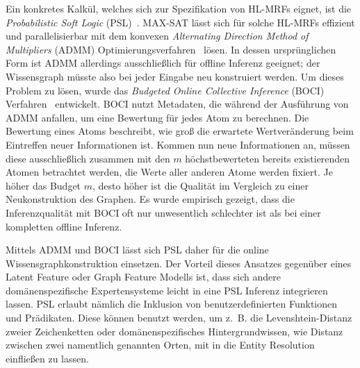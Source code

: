 Ein konkretes Kalkül, welches sich zur Spezifikation von HL-MRFs eignet, ist die \textit{Probabilistic Soft Logic} (PSL)~\cite{Broecheler2010}\cite{Bach2015}.
MAX-SAT lässt sich für solche HL-MRFs effizient und parallelisierbar mit dem konvexen \textit{Alternating Direction Method of Multipliers} (ADMM) Optimierungsverfahren~\cite{Boyd2011} lösen.
In dessen ursprünglichen Form ist ADMM allerdings ausschließlich für offline Inferenz geeignet;
der Wissensgraph müsste also bei jeder Eingabe neu konstruiert werden.
Um dieses Problem zu lösen, wurde das \textit{Budgeted Online Collective Inference} (BOCI) Verfahren~\cite{Pujara2015} entwickelt.
BOCI nutzt Metadaten, die während der Ausführung von ADMM anfallen, um eine Bewertung für jedes Atom zu berechnen.
Die Bewertung eines Atoms beschreibt, wie groß die erwartete Wertveränderung beim Eintreffen neuer Informationen ist.
Kommen nun neue Informationen an, müssen diese ausschließlich zusammen mit den $m$ höchstbewerteten bereits existierenden Atomen betrachtet werden, die Werte aller anderen Atome werden fixiert.
Je höher das Budget $m$, desto höher ist die Qualität im Vergleich zu einer Neukonstruktion des Graphen.
Es wurde empirisch gezeigt, dass die Inferenzqualität mit BOCI oft nur unwesentlich schlechter ist als bei einer kompletten offline Inferenz.

Mittels ADMM und BOCI lässt sich PSL daher für die online Wissensgraphkonstruktion einsetzen.
Der Vorteil dieses Ansatzes gegenüber eines Latent Feature oder Graph Feature Modells ist, dass sich andere domänenspezifische Expertensysteme leicht in eine PSL Inferenz integrieren lassen.
PSL erlaubt nämlich die Inklusion von benutzerdefinierten Funktionen und Prädikaten.
Diese können benutzt werden, um z.~B. die Levenshtein-Distanz zweier Zeichenketten oder domänenspezifisches Hintergrundwissen, wie Distanz zwischen zwei namentlich genannten Orten, mit in die Entity Resolution einfließen zu lassen.
